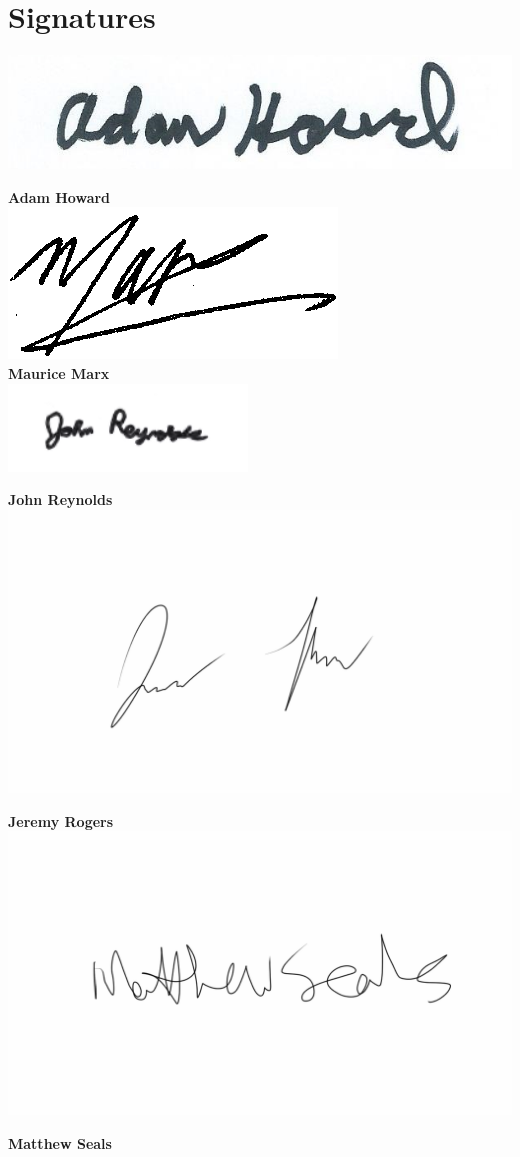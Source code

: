 \documentclass[12 pt]{article}
\begin{document}
 \pagebreak
 
 \section{Signatures}
	
\includegraphics[width=0.3\linewidth]{Adamsig}

	\textbf{Adam Howard} \hfill\\

	\includegraphics[width=0.3\linewidth]{Mauricesig} \\

	\textbf{Maurice Marx} \\

	\includegraphics[width=0.3\linewidth]{Johnsig}

	\textbf{John Reynolds} \\

	\includegraphics[width=0.3\linewidth]{Jeremysig}

	\textbf{Jeremy Rogers} \\

	\includegraphics[width=0.3\linewidth]{Matthewsig}

	\textbf{Matthew Seals} 
\end{document}
